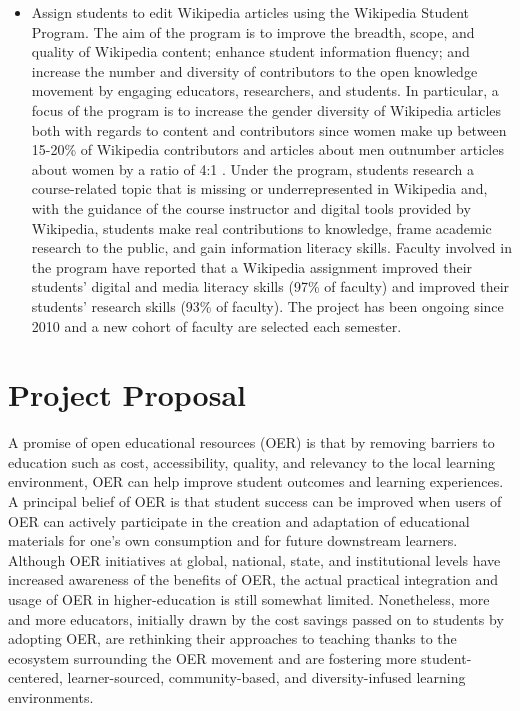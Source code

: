 \documentclass[11pt]{article}
\begin{document}
\begin{itemize}
  \item Assign students to edit Wikipedia articles using the Wikipedia Student Program.  The aim of the program is to improve the breadth, scope, and quality of Wikipedia content; enhance student information fluency; and increase the number and diversity of contributors to the open knowledge movement by engaging educators, researchers, and students. In particular, a focus of the program is to increase the gender diversity of Wikipedia articles both with regards to content and contributors since women make up between 15-20\% of Wikipedia contributors and articles about men outnumber articles about women by a ratio of 4:1 \cite{HC-MS:22}.  Under the program, students research a course-related topic that is missing or underrepresented in Wikipedia and, with the guidance of the course instructor and digital tools provided by Wikipedia, students make real contributions to knowledge, frame academic research to the public, and gain information literacy skills.  Faculty involved in the program have reported that a Wikipedia assignment improved their students' digital and media literacy skills (97\% of faculty) and improved their students' research skills (93\% of faculty).  The project has been ongoing since 2010 and a new cohort of faculty are selected each semester.

  
\end{itemize}


\section{Project Proposal}

A promise of open educational resources (OER) is that by removing barriers to education such as cost, accessibility, quality, and relevancy to the local learning environment, OER can help improve student outcomes and learning experiences.  A principal belief of OER is that student success can be improved when users of OER can actively participate in the creation and adaptation of educational materials for one's own consumption and for future downstream learners.  Although OER initiatives at global, national, state, and institutional levels have increased awareness of the benefits of OER, the actual practical integration and usage of OER in higher-education is still somewhat limited.  Nonetheless, more and more educators, initially drawn by the cost savings passed on to students by adopting OER, are rethinking their approaches to teaching thanks to the ecosystem surrounding the OER movement and are fostering more student-centered, learner-sourced, community-based, and diversity-infused learning environments.
\end{document}
